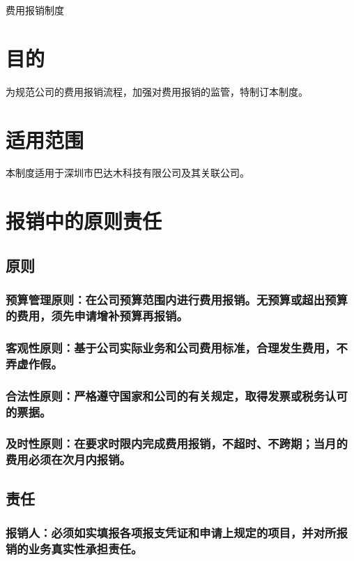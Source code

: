 \documentclass[scheme=plain,UTF8]{ctexart}
\begin{document}
\begin{center}
\Large 费用报销制度
\end{center}
\vspace{3ex}
\section{目的}
为规范公司的费用报销流程，加强对费用报销的监管，特制订本制度。
\nopagebreak[4]
\section{适用范围}
本制度适用于深圳市巴达木科技有限公司及其关联公司。
\nopagebreak[4]
\section{报销中的原则责任}
\subsection{原则}
\subsubsection{预算管理原则：在公司预算范围内进行费用报销。无预算或超出预算的费用，须先申请增补预算再报销。}
\subsubsection{客观性原则：基于公司实际业务和公司费用标准，合理发生费用，不弄虚作假。}
\subsubsection{合法性原则：严格遵守国家和公司的有关规定，取得发票或税务认可的票据。}
\subsubsection{及时性原则：在要求时限内完成费用报销，不超时、不跨期；当月的费用必须在次月内报销。}
\subsection{责任}
\subsubsection{报销人：必须如实填报各项报支凭证和申请上规定的项目，并对所报销的业务真实性承担责任。}
\end{document}
